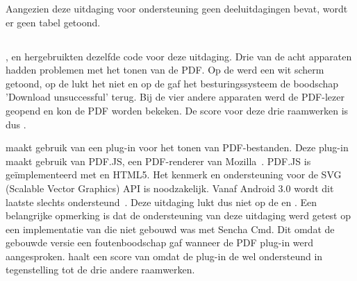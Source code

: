 Aangezien deze uitdaging voor ondersteuning geen deeluitdagingen bevat, wordt er geen tabel getoond.

% 
% 
% 
% 


\subsection{}
\label{sec:evaluatie-ondersteuning-pdf}

\kendo{}, \jqm{} en \lungo{} hergebruikten dezelfde code voor deze uitdaging.
Drie van de acht apparaten hadden problemen met het tonen van de PDF.
Op de \htc{} werd een wit scherm getoond, op de \gtab{} lukt het niet en op de \gs{} gaf het besturingssysteem de boodschap 'Download unsuccessful' terug.
Bij de vier andere apparaten werd de PDF-lezer geopend en kon de PDF worden bekeken.
De score voor deze drie raamwerken is dus .

\st{} maakt gebruik van een plug-in voor het tonen van PDF-bestanden.
Deze plug-in maakt gebruik van PDF.JS,  een PDF-renderer van Mozilla~\cite{Gal2010}.
PDF.JS is geïmplementeerd met \js{} en HTML5.
Het  kenmerk en ondersteuning voor de SVG (Scalable Vector Graphics) API is noodzakelijk.
Vanaf Android 3.0 wordt dit laatste slechts ondersteund~\cite{Deveria2013c}.
Deze uitdaging lukt dus niet op de \htc{} en \gtab{}.
Een belangrijke opmerking is dat de ondersteuning van deze uitdaging werd getest op een implementatie van \st{} die niet gebouwd was met Sencha Cmd.
Dit omdat de gebouwde versie een foutenboodschap gaf wanneer de PDF plug-in werd aangesproken.
\st{} haalt een score van  omdat de plug-in de \gs{} wel ondersteund in tegenstelling tot de drie andere raamwerken.

